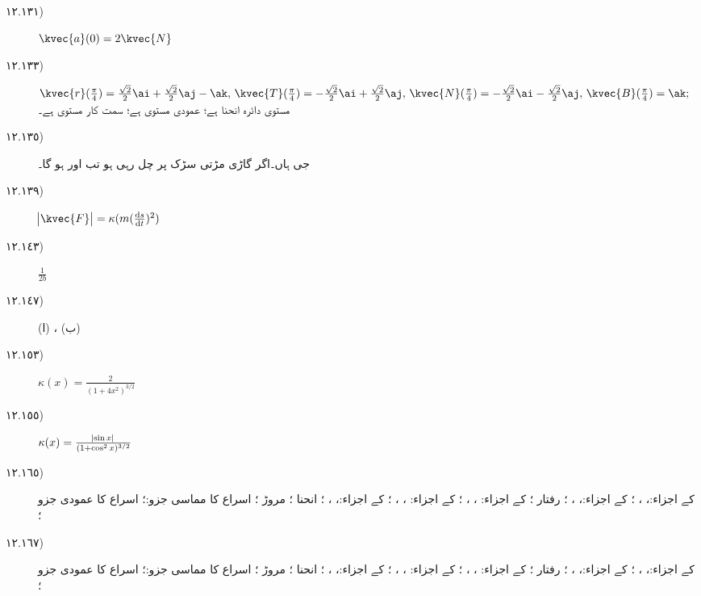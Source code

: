 \begin {description}
\item [
\protect ١٢.\protect ١٣١)
]
 $\kvec {a}(0)=2\kvec {N}$ 
\item [
\protect ١٢.\protect ١٣٣)
]
 $\kvec {r}(\tfrac {\pi }{4})=\tfrac {\sqrt {2}}{2}\ai +\tfrac {\sqrt {2}}{2}\aj -\ak ,\,\kvec {T}(\tfrac {\pi }{4})=-\tfrac {\sqrt {2}}{2}\ai +\tfrac {\sqrt {2}}{2}\aj ,\,\kvec {N}(\tfrac {\pi }{4})=-\tfrac {\sqrt {2}}{2}\ai -\tfrac {\sqrt {2}}{2}\aj ,\,\kvec {B}(\tfrac {\pi }{4})=\ak ;$\\ مستوی دائرہ انحنا  ہے؛ عمودی مستوی  ہے؛ سمت کار مستوی  ہے۔ 
\item [
\protect ١٢.\protect ١٣٥)
]
 جی ہاں۔اگر گاڑی مڑتی سڑک  پر چل رہی ہو تب  اور  ہو گا۔ 
\item [
\protect ١٢.\protect ١٣٩)
]
 $\abs {\kvec {F}}=\kappa (m(\tfrac {\dif s}{\dif t})^2)$ 
\item [
\protect ١٢.\protect ١٤٣)
]
 $\tfrac {1}{2b}$ 
\item [
\protect ١٢.\protect ١٤٧)
]
 (ا) ، (ب)  
\item [
\protect ١٢.\protect ١٥٣)
]
 $\kappa (x)=\tfrac {2}{(1+4x^2)^{3/2}}$ 
\item [
\protect ١٢.\protect ١٥٥)
]
 $\kappa (x)=\tfrac {\abs {\sin x}}{(1+\cos ^2x)^{3/2}}$ 
\item [
\protect ١٢.\protect ١٦٥)
]
  کے اجزاء:، ، ؛  کے اجزاء:، ، ؛ رفتار ؛  کے اجزاء: ، ، ؛  کے اجزاء: ، ، ؛  کے اجزاء:، ، ؛ انحنا ؛ مروڑ ؛ اسراع کا مماسی جزو:؛ اسراع کا عمودی جزو ؛ 
\item [
\protect ١٢.\protect ١٦٧)
]
  کے اجزاء:، ، ؛  کے اجزاء:، ، ؛ رفتار ؛  کے اجزاء: ، ، ؛  کے اجزاء: ، ، ؛  کے اجزاء:، ، ؛ انحنا ؛ مروڑ ؛ اسراع کا مماسی جزو:؛ اسراع کا عمودی جزو ؛ 
\end {description}
